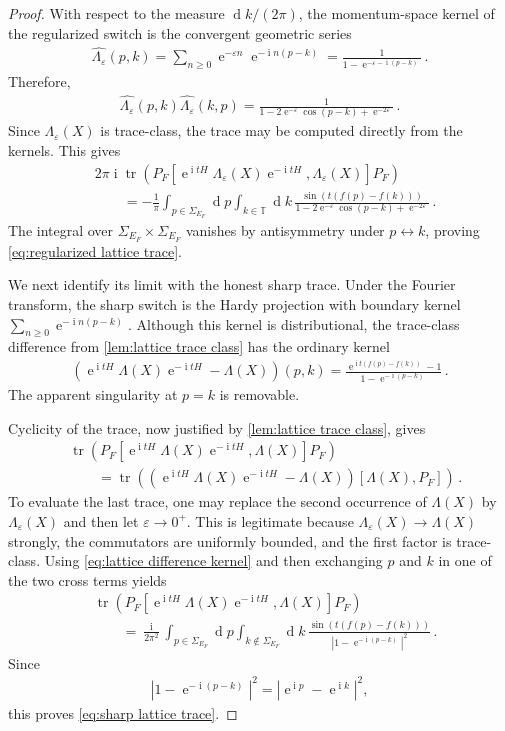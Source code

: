 \documentclass[a4paper,10pt]{article}
\numberwithin{equation}{section}
\theoremstyle{plain}
\theoremstyle{plain}
\theoremstyle{plain}
\theoremstyle{plain}
\theoremstyle{plain}
\theoremstyle{remark}
\theoremstyle{definition}
\theoremstyle{plain}
\newcommand{\ee}{\operatorname{e}}
\newcommand{\ii}{\operatorname{i}}
\newcommand{\TT}{\mathbb{T}}
\newcommand{\dif}{\operatorname{d}\!} %
\newcommand{\tr}{\operatorname{tr}}
\newcommand{\ve}{\varepsilon}
\newcommand{\eq}[1]{\begin{align*}#1\end{align*}}
\newcommand{\eql}[1]{\begin{align}#1\end{align}}
\begin{document}
\begin{proof}
With respect to the measure $\dif{k}/(2\pi)$, the momentum-space kernel of
the regularized switch is the convergent geometric series
\eq{\widehat{\Lambda_\ve}(p,k)
=
\sum_{n\geq0}\ee^{-\ve n}\ee^{-\ii n(p-k)}
=
\frac{1}{1-\ee^{-\ve-\ii(p-k)}}\,.}
Therefore,
\eq{\widehat{\Lambda_\ve}(p,k)
\widehat{\Lambda_\ve}(k,p)
=
\frac{1}
{1-2\ee^{-\ve}\cos(p-k)+\ee^{-2\ve}}\,.}
Since $\Lambda_\ve(X)$ is trace-class, the trace may be computed directly
from the kernels. This gives
\eq{&2\pi\ii\tr\left(
P_F\left[
\ee^{\ii tH}\Lambda_\ve(X)\ee^{-\ii tH},
\Lambda_\ve(X)
\right]P_F
\right)\\
&\qquad=
-\frac{1}{\pi}
\int_{p\in\Sigma_{E_F}}\dif{p}
\int_{k\in\TT}\dif{k}\,
\frac{\sin\left(t(f(p)-f(k))\right)}
{1-2\ee^{-\ve}\cos(p-k)+\ee^{-2\ve}}\,.}
The integral over $\Sigma_{E_F}\times\Sigma_{E_F}$ vanishes by antisymmetry
under $p\leftrightarrow k$, proving
\cref{eq:regularized lattice trace}.

We next identify its limit with the honest sharp trace. Under the Fourier
transform, the sharp switch is the Hardy projection with boundary kernel
$\sum_{n\geq0}\ee^{-\ii n(p-k)}$. Although this kernel is distributional,
the trace-class difference from \cref{lem:lattice trace class} has the
ordinary kernel
\eql{\left(
\ee^{\ii tH}\Lambda(X)\ee^{-\ii tH}-\Lambda(X)
\right)(p,k)
=
\frac{\ee^{\ii t(f(p)-f(k))}-1}
{1-\ee^{-\ii(p-k)}}\,.
\label{eq:lattice difference kernel}}
The apparent singularity at $p=k$ is removable.

Cyclicity of the trace, now justified by
\cref{lem:lattice trace class}, gives
\eq{&\tr\left(
P_F\left[
\ee^{\ii tH}\Lambda(X)\ee^{-\ii tH},\Lambda(X)
\right]P_F
\right)\\
&\qquad=
\tr\left(
\left(
\ee^{\ii tH}\Lambda(X)\ee^{-\ii tH}-\Lambda(X)
\right)
[\Lambda(X),P_F]
\right)\,.}
To evaluate the last trace, one may replace the second occurrence of
$\Lambda(X)$ by $\Lambda_\ve(X)$ and then let $\ve\to0^+$. This is legitimate
because $\Lambda_\ve(X)\to\Lambda(X)$ strongly, the commutators are uniformly
bounded, and the first factor is trace-class. Using
\cref{eq:lattice difference kernel} and then exchanging $p$ and $k$ in one
of the two cross terms yields
\eq{&\tr\left(
P_F\left[
\ee^{\ii tH}\Lambda(X)\ee^{-\ii tH},\Lambda(X)
\right]P_F
\right)\\
&\qquad=
\frac{\ii}{2\pi^2}
\int_{p\in\Sigma_{E_F}}\dif{p}
\int_{k\notin\Sigma_{E_F}}\dif{k}\,
\frac{\sin\left(t(f(p)-f(k))\right)}
{\left|1-\ee^{-\ii(p-k)}\right|^2}\,.}
Since
\eq{\left|1-\ee^{-\ii(p-k)}\right|^2
=\left|\ee^{\ii p}-\ee^{\ii k}\right|^2,}
this proves \cref{eq:sharp lattice trace}.


\end{proof}
\end{document}
